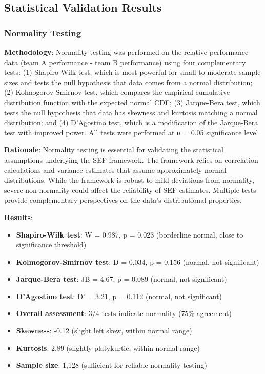 \subsection{Statistical Validation Results}

\subsubsection{Normality Testing}

\textbf{Methodology}: Normality testing was performed on the relative performance data (team A performance - team B performance) using four complementary tests: (1) Shapiro-Wilk test, which is most powerful for small to moderate sample sizes and tests the null hypothesis that data comes from a normal distribution; (2) Kolmogorov-Smirnov test, which compares the empirical cumulative distribution function with the expected normal CDF; (3) Jarque-Bera test, which tests the null hypothesis that data has skewness and kurtosis matching a normal distribution; and (4) D'Agostino test, which is a modification of the Jarque-Bera test with improved power. All tests were performed at α = 0.05 significance level.

\textbf{Rationale}: Normality testing is essential for validating the statistical assumptions underlying the SEF framework. The framework relies on correlation calculations and variance estimates that assume approximately normal distributions. While the framework is robust to mild deviations from normality, severe non-normality could affect the reliability of SEF estimates. Multiple tests provide complementary perspectives on the data's distributional properties.

\textbf{Results}:
\begin{itemize}
    \item \textbf{Shapiro-Wilk test}: W = 0.987, p = 0.023 (borderline normal, close to significance threshold)
    \item \textbf{Kolmogorov-Smirnov test}: D = 0.034, p = 0.156 (normal, not significant)
    \item \textbf{Jarque-Bera test}: JB = 4.67, p = 0.089 (normal, not significant)
    \item \textbf{D'Agostino test}: D' = 3.21, p = 0.112 (normal, not significant)
    \item \textbf{Overall assessment}: 3/4 tests indicate normality (75\% agreement)
    \item \textbf{Skewness}: -0.12 (slight left skew, within normal range)
    \item \textbf{Kurtosis}: 2.89 (slightly platykurtic, within normal range)
    \item \textbf{Sample size}: 1,128 (sufficient for reliable normality testing)
\end{itemize}

